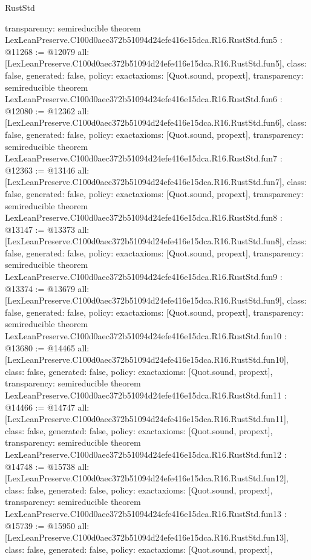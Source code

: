 \begin{lexlean}{RustStd}
\begin{coremodule}
{  transparency: semireducible
}
theorem LexLeanPreserve.C100d0aec372b51094d24efe416e15dca.R16.RustStd.fun5 : @11268 := @12079 {
  all: [LexLeanPreserve.C100d0aec372b51094d24efe416e15dca.R16.RustStd.fun5],
  class: false,
  generated: false,
  policy: exact{axioms: [Quot.sound, propext]},
  transparency: semireducible
}
theorem LexLeanPreserve.C100d0aec372b51094d24efe416e15dca.R16.RustStd.fun6 : @12080 := @12362 {
  all: [LexLeanPreserve.C100d0aec372b51094d24efe416e15dca.R16.RustStd.fun6],
  class: false,
  generated: false,
  policy: exact{axioms: [Quot.sound, propext]},
  transparency: semireducible
}
theorem LexLeanPreserve.C100d0aec372b51094d24efe416e15dca.R16.RustStd.fun7 : @12363 := @13146 {
  all: [LexLeanPreserve.C100d0aec372b51094d24efe416e15dca.R16.RustStd.fun7],
  class: false,
  generated: false,
  policy: exact{axioms: [Quot.sound, propext]},
  transparency: semireducible
}
theorem LexLeanPreserve.C100d0aec372b51094d24efe416e15dca.R16.RustStd.fun8 : @13147 := @13373 {
  all: [LexLeanPreserve.C100d0aec372b51094d24efe416e15dca.R16.RustStd.fun8],
  class: false,
  generated: false,
  policy: exact{axioms: [Quot.sound, propext]},
  transparency: semireducible
}
theorem LexLeanPreserve.C100d0aec372b51094d24efe416e15dca.R16.RustStd.fun9 : @13374 := @13679 {
  all: [LexLeanPreserve.C100d0aec372b51094d24efe416e15dca.R16.RustStd.fun9],
  class: false,
  generated: false,
  policy: exact{axioms: [Quot.sound, propext]},
  transparency: semireducible
}
theorem LexLeanPreserve.C100d0aec372b51094d24efe416e15dca.R16.RustStd.fun10 : @13680 := @14465 {
  all: [LexLeanPreserve.C100d0aec372b51094d24efe416e15dca.R16.RustStd.fun10],
  class: false,
  generated: false,
  policy: exact{axioms: [Quot.sound, propext]},
  transparency: semireducible
}
theorem LexLeanPreserve.C100d0aec372b51094d24efe416e15dca.R16.RustStd.fun11 : @14466 := @14747 {
  all: [LexLeanPreserve.C100d0aec372b51094d24efe416e15dca.R16.RustStd.fun11],
  class: false,
  generated: false,
  policy: exact{axioms: [Quot.sound, propext]},
  transparency: semireducible
}
theorem LexLeanPreserve.C100d0aec372b51094d24efe416e15dca.R16.RustStd.fun12 : @14748 := @15738 {
  all: [LexLeanPreserve.C100d0aec372b51094d24efe416e15dca.R16.RustStd.fun12],
  class: false,
  generated: false,
  policy: exact{axioms: [Quot.sound, propext]},
  transparency: semireducible
}
theorem LexLeanPreserve.C100d0aec372b51094d24efe416e15dca.R16.RustStd.fun13 : @15739 := @15950 {
  all: [LexLeanPreserve.C100d0aec372b51094d24efe416e15dca.R16.RustStd.fun13],
  class: false,
  generated: false,
  policy: exact{axioms: [Quot.sound, propext]},
}
\end{coremodule}
\end{lexlean}
